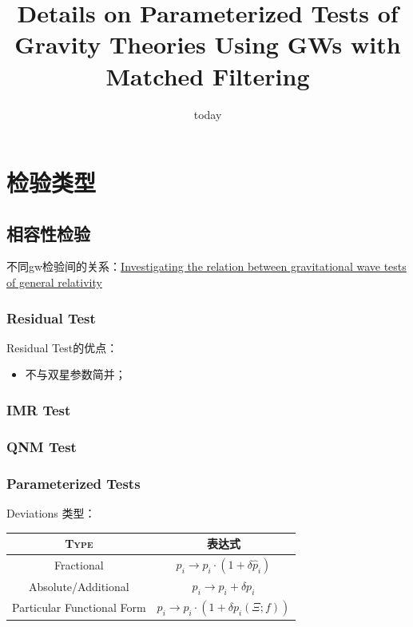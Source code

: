 \documentclass[CJK]{paper}  %
\begin{document}
\title{Details on Parameterized Tests of Gravity Theories Using GWs with Matched Filtering}
\date{today}
\maketitle


\newpage
\tableofcontents


\newpage
\section{检验类型}

\subsection{相容性检验}
\par 不同gw检验间的关系：\href{https://arxiv.org/abs/2109.06988}{Investigating the relation between gravitational wave tests of general relativity} \cite{gw_tests_relation}


\subsubsection{Residual Test}

Residual Test的优点：
\begin{itemize}
	\item[1. ] 不与双星参数简并\cite{test_GR_GW150914}；
\end{itemize}


\subsubsection{IMR Test}


\subsubsection{QNM Test}


\subsubsection{Parameterized Tests}

\par Deviations 类型：
\begin{table}[h!]
	\begin{center}
		\begin{tabular}{|c|c|}
			\hline
			\textsc{Type} & 表达式 \\
			\hline
			Fractional & $p_i \longrightarrow p_i \cdot (1 + \delta \hat{p}_i)$ \\
			\hline
			Absolute/Additional & $p_i \longrightarrow p_i + \delta p_i$ \\
			\hline
			Particular Functional Form &  $p_i \longrightarrow p_i \cdot (1 + \delta p_i(\Xi;f))$\\
			\hline
		\end{tabular}
	\end{center}
\end{table}
\end{document}
